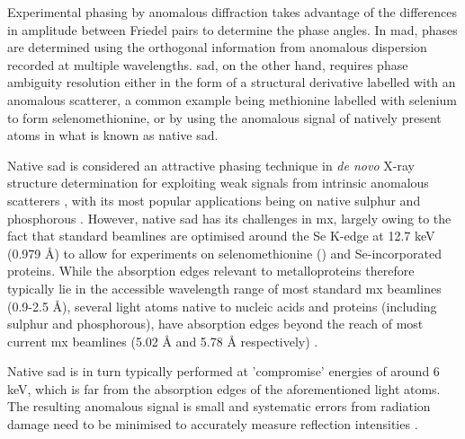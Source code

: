 Experimental phasing by anomalous diffraction takes advantage of the differences in amplitude between Friedel pairs to determine the phase angles. In \ac{mad}, phases are determined using the orthogonal information from anomalous dispersion recorded at multiple wavelengths. \Ac{sad}, on the other hand, requires phase ambiguity resolution either in the form of a structural derivative labelled with an anomalous scatterer, a common example being methionine labelled with selenium to form selenomethionine, or by using the anomalous signal of natively present atoms in what is known as native \ac{sad}.

Native \ac{sad} is considered an attractive phasing technique in  \textit{de novo} X-ray structure determination %
for exploiting weak signals from intrinsic anomalous scatterers \cite{Basu2019}, with its most popular applications being on native sulphur and phosphorous \cite{Karasawa2022}. However, native \ac{sad} has its challenges in \ac{mx}, largely owing to the fact that standard beamlines are optimised around the Se K-edge at 12.7 \unit{keV} (0.979 Å) to allow for experiments on selenomethionine () and Se-incorporated proteins.
While the absorption edges relevant to metalloproteins therefore typically lie in the accessible wavelength range of most standard \ac{mx} beamlines (0.9-2.5 Å), %
several light atoms native to nucleic acids and proteins (including sulphur and phosphorous), have absorption edges beyond the reach of most current \ac{mx} beamlines (5.02 Å and 5.78 Å respectively) \cite{Olieric2016}. 

Native \ac{sad} is in turn typically performed at 'compromise' energies of around 6 \unit{keV}, which is far from the absorption edges of the aforementioned light atoms. The resulting anomalous signal is small and systematic errors from radiation damage need to be minimised to accurately measure reflection intensities \cite{DjinovicCarugo2005}.%


